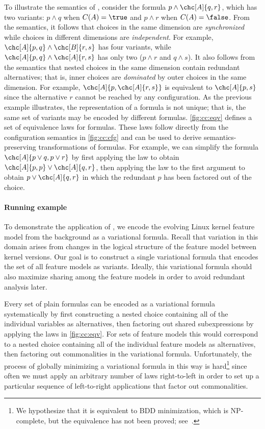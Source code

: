 To illustrate the semantics of \vpl{}, consider the formula
$p\wedge\chc[A]{q,r}$, which has two variants: $p\wedge q$ when $C(A)=\true$
and $p\wedge r$ when $C(A)=\false$.
%
From the semantics, it follows that choices in the same dimension are
\emph{synchronized} while choices in different dimensions are
\emph{independent}. For example, $\chc[A]{p,q}\wedge\chc[B]{r,s}$ has four
variants, while $\chc[A]{p,q}\wedge\chc[A]{r,s}$ has only two ($p\wedge r$ and
$q\wedge s$).
%
It also follows from the semantics that nested choices in the same dimension
contain redundant alternatives; that is, inner choices are \emph{dominated} by
outer choices in the same dimension. For example, $\chc[A]{p,\chc[A]{r,s}}$ is
equivalent to $\chc[A]{p,s}$ since the alternative $r$ cannot be reached by any
configuration.
%
As the previous example illustrates, the representation of a \vpl{} formula is
not unique; that is, the same set of variants may be encoded by different
formulas. \autoref{fig:cc:eqv} defines a set of equivalence laws for
\vpl{} formulas. These laws follow directly from the configuration semantics in
\autoref{fig:cc:cfg} and can be used to derive semantics-preserving
transformations of \vpl{} formulas.
%
For example, we can simplify the formula $\chc[A]{p\vee q, p\vee r}$ by first
applying the  law to obtain $\chc[A]{p,p}\vee\chc[A]{q,r}$, then applying
the  law to the first argument to obtain $p\vee\chc[A]{q,r}$ in which
the redundant $p$ has been factored out of the choice.
%
\paragraph{Running example}
To demonstrate the application of \vpl{}, we encode the evolving Linux kernel
feature model from the background as a variational formula. Recall that
variation in this domain arises from changes in the logical structure of the
feature model between kernel versions. Our goal is to construct a single
variational formula that encodes the set of all feature models as variants.
Ideally, this variational formula should also maximize sharing among the feature
models in order to avoid redundant analysis later.

Every set of plain formulas can be encoded as a variational formula
systematically by first constructing a nested choice containing all of the
individual variables as alternatives, then factoring out shared subexpressions
by applying the laws in \autoref{fig:cc:eqv}. For sets of feature models this would
correspond to a nested choice containing all of the individual feature models as
alternatives, then factoring out commonalities in the variational formula.
%
Unfortunately, the process of globally minimizing a variational formula in this
way is hard\footnote{\label{vpl:bdd}We hypothesize that it is equivalent to BDD minimization,
which is NP-complete, but the equivalence has not been proved;
see~\cite{Walk14onward}.} since often we must apply an arbitrary number of laws
right-to-left in order to set up a particular sequence of left-to-right
applications that factor out commonalities.

